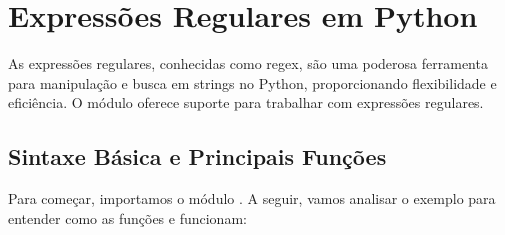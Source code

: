 \documentclass[letterpaper,10pt,english]{jupyterBook}
\begin{document}
\section{Expressões Regulares em Python}
\label{\detokenize{chapters/ch6/ch6:expressoes-regulares-em-python}}
\sphinxAtStartPar
As expressões regulares, conhecidas como regex, são uma poderosa ferramenta para manipulação e busca em strings no Python, proporcionando flexibilidade e eficiência. O módulo  oferece suporte para trabalhar com expressões regulares.


\subsection{Sintaxe Básica e Principais Funções}
\label{\detokenize{chapters/ch6/ch6:sintaxe-basica-e-principais-funcoes}}
\sphinxAtStartPar
Para começar, importamos o módulo . A seguir, vamos analisar o exemplo para entender como as funções  e  funcionam:

\sphinxAtStartPar
{}
\end{document}
